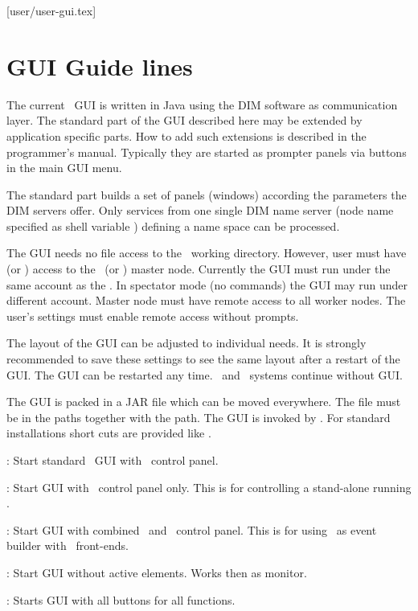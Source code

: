 [user/user-gui.tex]
\section{GUI Guide lines}
The current \dabc\ GUI is written in Java using the DIM software as communication layer.
The standard part of the GUI described here may be extended by application specific parts.
How to add such extensions is described in the programmer's manual.
Typically they are started as prompter panels via buttons in the
main GUI menu.

The standard part builds a set of panels (windows) according the parameters
the DIM servers offer. Only services from one single DIM name server
(node name specified as shell variable )
defining a name space can be processed.

The GUI needs no file access to the \dabc\ working directory.
However, user must have  (or ) access to
the \dabc\ (or \mbs) master node.
Currently the GUI must run under the same account as the \dabc.
In spectator mode (no commands) the GUI may run under different account.
Master node must have remote access to all worker nodes.
The user's  settings must enable remote access without
prompts.

The layout of the GUI can be adjusted to individual needs.
It is strongly recommended to save these settings to see the same layout
after a restart of the GUI. The GUI can be restarted any time.
\dabc\ and \mbs\ systems continue without GUI.

The GUI is packed in a JAR file  which can be moved everywhere. The file must be in the
 paths together with the  path.
The GUI is invoked by .
For standard installations short cuts are provided like .
\bdes
\item[dabc]: Start standard \dabc\ GUI with \dabc\ control panel.
\item[mbs]: Start GUI with \mbs\ control panel only. 
This is for controlling a stand-alone running \mbs. 
\item[dabs]: Start GUI with combined \mbs\ and \dabc\ control panel.
This is for using \dabc\ as event builder with \mbs\ front-ends.
\item[moni]: Start GUI without active elements. Works then as monitor.
\item[guru]: Starts GUI with all buttons for all functions.
\edes

